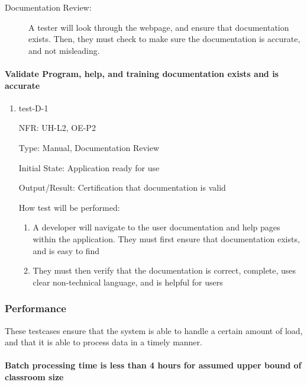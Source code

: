 \documentclass[12pt, titlepage]{article}
\begin{document}
\begin{description}
  \item[Documentation Review:] A tester will look through the webpage, and
  ensure that documentation exists. Then, they must check to make sure the
  documentation is accurate, and not misleading. 
\end{description}

\paragraph{Validate Program, help, and training documentation exists and is accurate}
\begin{enumerate}
  \item{test-D-1}
  
  NFR: UH-L2, OE-P2

  Type: Manual, Documentation Review

  Initial State: Application ready for use

  Output/Result: Certification that documentation is valid

  How test will be performed:
  \begin{enumerate}
    \item A developer will navigate to the user documentation and help pages within the application. They must first ensure that documentation exists, and is easy to find
    \item They must then verify that the documentation is correct, complete, uses clear non-technical language, and is helpful for users
  \end{enumerate}
\end{enumerate}


\subsubsection{Performance}
These testcases ensure that the system is able to handle a certain amount of load, and that it is able to process data in a timely manner.

\paragraph{Batch processing time is less than 4 hours for assumed upper bound of classroom size}
\end{document}

